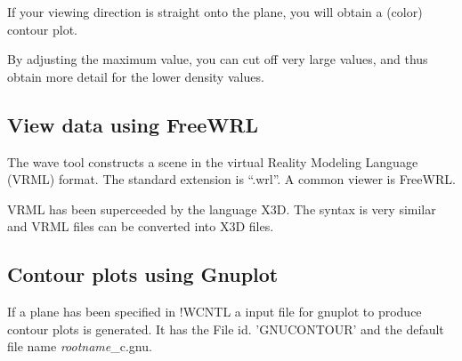 \documentclass[final,12pt,makeidx,DIV=calc]{article}
\begin{document}
{{{{{{\begin{enumerate}
\begin{itemize}

  If your viewing direction is straight onto the plane, you will obtain
  a (color) contour plot.

  By adjusting the maximum value, you can cut off very large values,
  and thus obtain more detail for the lower density values.
\end{itemize}
\end{enumerate}

\subsection{View data using FreeWRL}
The wave tool constructs a scene in the virtual Reality Modeling
Language (VRML) format. The standard extension is ``.wrl''. A common
viewer is FreeWRL.

VRML has been superceeded by the language X3D. The syntax is very
similar and VRML files can be converted into X3D files.

\newpage
\subsection{Contour plots using Gnuplot}
If a plane has been specified in !WCNTL a input file for gnuplot to
produce contour plots is generated. It has the File id. 'GNUCONTOUR'
and the default file name \textit{rootname}\_c.gnu.

}}}}}}
\end{document}
